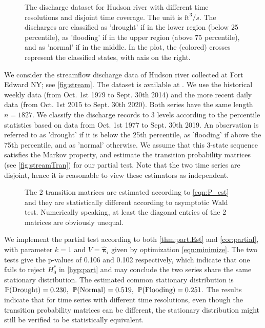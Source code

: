 \documentclass[12pt]{article}
\numberwithin{thm}{section}
\numberwithin{defn}{section}
\numberwithin{lem}{section}
\numberwithin{prop}{section}
\numberwithin{cor}{section}
\numberwithin{rem}{section}
\begin{document}
\begin{figure}[H] %
    \centering
    \centerline{}
    \caption{The discharge dataset for Hudson river with different time resolutions and disjoint time coverage. The unit is $\mbox{ft}^3/s$. The discharges are classified as 'drought' if in the lower region (below 25 percentile), as 'flooding' if in the upper region (above 75 percentile), and as 'normal' if in the middle. In the plot, the (colored) crosses represent the classified states, with axis on the right.}
   \label{fig:stream}
\end{figure}

We consider the streamflow discharge data of Hudson river collected at Fort Edward NY; see \autoref{fig:stream}. The dataset is available at \cite{usgs}. We use the historical weekly data (from Oct. 1st 1979 to Sept. 30th 2014) and the more recent daily data (from Oct. 1st 2015 to Sept. 30th 2020). Both series have the same length $n = 1827$. We classify the discharge records to 3 levels according to the percentile statistics based on data from Oct. 1st 1977 to Sept. 30th 2019. An observation is referred to as 'drought' if it is below the 25th percentile, as 'flooding' if above the 75th percentile, and as 'normal' otherwise. We assume that this 3-state sequence satisfies the Markov property, and estimate the transition probability matrices (see \autoref{fig:streamTran}) for our partial test. Note that the two time series are disjoint, hence it is reasonable to view these estimators as independent.

\begin{figure}[htbp] %
    \centering
    \centerline{}
    \caption{The 2 transition matrices are estimated according to \eqref{eqn:P_est} and they are statistically different according to asymptotic Wald test. Numerically speaking, at least the diagonal entries of the 2 matrices are obviously unequal.}
   \label{fig:streamTran}
\end{figure}

We implement the partial test according to both \autoref{thm:part.Est} and \autoref{cor:partial}, with parameter $k = 1$ and $V = \bm{\widehat{\pi}}_i$ given by optimization \eqref{eqn:minimize}. The two tests give the p-values of 0.106 and 0.102 respectively, which indicate that one fails to reject $H_0^{*}$ in \eqref{hyp:part} and may conclude the two series share the same stationary distribution. The estimated common stationary distribution is
$
\mathbb{P}(\text{Drought}) = 0.230, \hspace{0.15cm} \mathbb{P}(\text{Normal}) = 0.519, \hspace{0.15cm} \mathbb{P}(\text{Flooding}) = 0.251.
$
The results indicate that for time series with different time resolutions, even though the transition probability matrices can be different, the stationary distribution might still be verified to be statistically equivalent.
\end{document}
